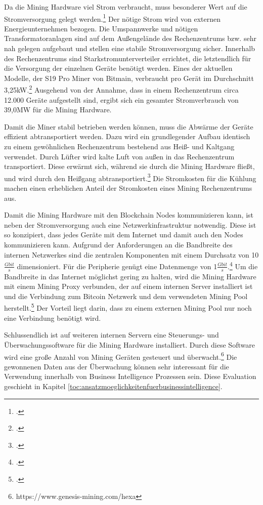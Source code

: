 Da die Mining Hardware viel Strom verbraucht, muss besonderer Wert auf die Stromversorgung gelegt
werden.\footcite[Vgl.][S. 327]{derks2018chaining} Der nötige Strom wird von externen Energieunternehmen bezogen. Die
Umspannwerke und nötigen Transformatoranlagen sind auf dem Außengelände des Rechenzentrums bzw. sehr nah gelegen
aufgebaut und stellen eine stabile Stromversorgung sicher. Innerhalb des Rechenzentrums sind Starkstromunterverteiler
errichtet, die letztendlich für die Versorgung der einzelnen Geräte benötigt werden. Eines der aktuellen Modelle,
der S19 Pro Miner von Bitmain, verbraucht pro Gerät im Durchschnitt 3,25kW.\footcite[Vgl.][]{s19pro2021consumption}
Ausgehend von der Annahme, dass in einem Rechenzentrum circa 12.000 Geräte aufgestellt sind, ergibt sich ein gesamter
Stromverbrauch von 39,0MW für die Mining Hardware.

Damit die Miner stabil betrieben werden können, muss die Abwärme der Geräte effizient abtransportiert werden. Dazu
wird ein grundlegender Aufbau identisch zu einem gewöhnlichen Rechenzentrum bestehend aus Heiß- und Kaltgang verwendet.
Durch Lüfter wird kalte Luft von außen in das Rechenzentrum transportiert. Diese erwärmt sich, während sie durch die
Mining Hardware fließt, und wird durch den Heißgang abtransportiert.\footcite[Vgl.][]{appendix:layoutkardok} Die
Stromkosten für die Kühlung machen einen erheblichen Anteil der Stromkosten eines Mining Rechenzentrums aus.

Damit die Mining Hardware mit den Blockchain Nodes kommunizieren kann, ist neben der Stromversorgung auch eine
Netzwerkinfrastruktur notwendig. Diese ist so konzipiert, dass jedes Geräte mit dem Internet und damit auch den Nodes
kommunizieren kann. Aufgrund der Anforderungen an die Bandbreite des internen Netzwerkes sind die zentralen
Komponenten mit einem Durchsatz von 10$\frac{Gbit}{s}$ dimensioniert. Für die Peripherie genügt eine Datenmenge
von 1$\frac{Gbit}{s}$.\footcite[Vgl.][]{appendix:networktopology} Um die Bandbreite in das Internet möglichst
gering zu halten, wird die Mining Hardware mit einem Mining Proxy verbunden, der auf einem internen Server
installiert ist und die Verbindung zum Bitcoin Netzwerk und dem verwendeten Mining Pool
herstellt.\footcite[Vgl.][]{appendix:miningproxy} Der Vorteil liegt darin, dass zu einem externen Mining Pool
nur noch eine Verbindung benötigt wird.

Schlussendlich ist auf weiteren internen Servern eine Steuerungs- und Überwachungssoftware für die Mining Hardware
installiert. Durch diese Software wird eine große Anzahl von Mining Geräten gesteuert und
überwacht.\footnote{https://www.genesis-mining.com/hexa} Die gewonnenen Daten aus der Überwachung können sehr
interessant für die Verwendung innerhalb von Business Intelligence Prozessen sein. Diese Evaluation geschieht
in Kapitel \ref{toc:ansatzmoeglichkeitenfuerbusinessintelligence}.

